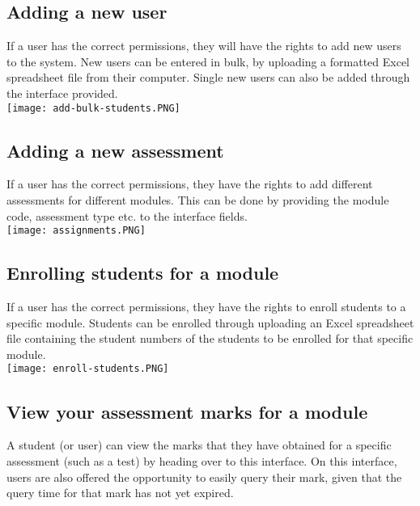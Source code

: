 \documentclass[a4paper,12pt]{article}
\begin{document}
    	\subsection{Adding a new user}
    	
        If a user has the correct permissions, they will have the rights to add new users to the system. New users can be entered in bulk, by uploading a formatted Excel spreadsheet file from their computer. Single new users can also be added through the interface provided.\\[1.0cm]
        
        \texttt{[image: add-bulk-students.PNG]}\\[1.0cm]  
        
    	\subsection{Adding a new assessment}
        
        If a user has the correct permissions, they have the rights to add different assessments for different modules. This can be done by providing the module code, assessment type etc. to the interface fields.\\[1.0cm]
        
        \texttt{[image: assignments.PNG]}\\[1.0cm]
        
        \subsection{Enrolling students for a module}
        
        If a user has the correct permissions, they have the rights to enroll students to a specific module. Students can be enrolled through uploading an Excel spreadsheet file containing the student numbers of the students to be enrolled for that specific module.\\[1.0cm]
        
        \texttt{[image: enroll-students.PNG]}\\[1.0cm]
     	\pagebreak
    	\subsection{View your assessment marks for a module}
        
        A student (or user) can view the marks that they have obtained for a specific assessment (such as a test) by heading over to this interface. On this interface, users are also offered the opportunity to easily query their mark, given that the query time for that mark has not yet expired.\\[1.0cm]
        
\end{document}
